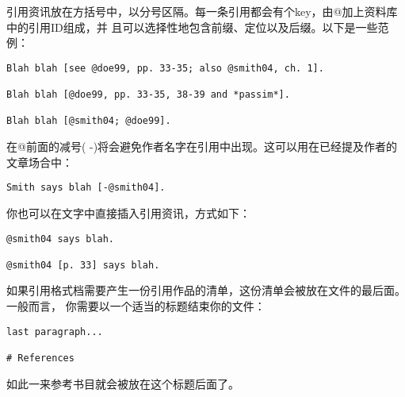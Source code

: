 \documentclass[fancyhdr,bookmark]{ctexbook}
\begin{document}
引用资讯放在方括号中，以分号区隔。每一条引用都会有个key，由@加上资料库中的引用ID组成，并
且可以选择性地包含前缀、定位以及后缀。以下是一些范例：

\begin{lstlisting}
Blah blah [see @doe99, pp. 33-35; also @smith04, ch. 1].

Blah blah [@doe99, pp. 33-35, 38-39 and *passim*].

Blah blah [@smith04; @doe99].
\end{lstlisting}

在@前面的减号(
-)将会避免作者名字在引用中出现。这可以用在已经提及作者的文章场合中：

\begin{lstlisting}
Smith says blah [-@smith04].
\end{lstlisting}

你也可以在文字中直接插入引用资讯，方式如下：

\begin{lstlisting}
@smith04 says blah.

@smith04 [p. 33] says blah.
\end{lstlisting}

如果引用格式档需要产生一份引用作品的清单，这份清单会被放在文件的最后面。一般而言，
你需要以一个适当的标题结束你的文件：

\begin{lstlisting}
last paragraph...

# References
\end{lstlisting}

如此一来参考书目就会被放在这个标题后面了。

\backmatter
\end{document}
